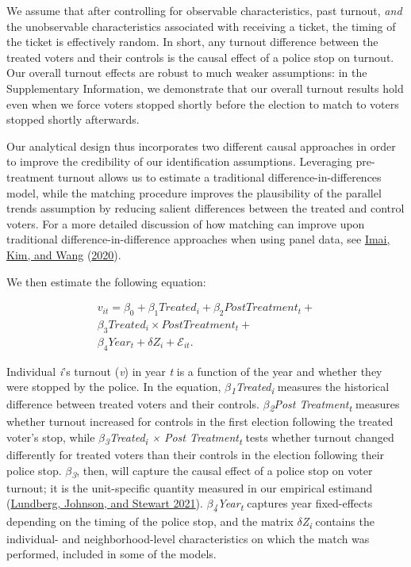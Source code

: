 \documentclass[
  12pt,
]{article}
\begin{document}
We assume that after controlling for observable characteristics, past turnout, \emph{and} the unobservable characteristics associated with receiving a ticket, the timing of the ticket is effectively random. In short, any turnout difference between the treated voters and their controls is the causal effect of a police stop on turnout. Our overall turnout effects are robust to much weaker assumptions: in the Supplementary Information, we demonstrate that our overall turnout results hold even when we force voters stopped shortly before the election to match to voters stopped shortly afterwards.

Our analytical design thus incorporates two different causal approaches in order to improve the credibility of our identification assumptions. Leveraging pre-treatment turnout allows us to estimate a traditional difference-in-differences model, while the matching procedure improves the plausibility of the parallel trends assumption by reducing salient differences between the treated and control voters. For a more detailed discussion of how matching can improve upon traditional difference-in-difference approaches when using panel data, see \protect\hyperlink{ref-Imai2020}{Imai, Kim, and Wang} (\protect\hyperlink{ref-Imai2020}{2020}).

We then estimate the following equation:

\begin{gather}
\label{eq:1}
v_{it}=\beta_0+\beta_1Treated_{i}+\beta_2Post Treatment_{t} + \nonumber \\
\beta_3Treated_{i}\times Post Treatment_{t} + \\
\beta_4Year_{t} + \delta{Z}_{i} + \mathcal{E}_{it}. \nonumber
\end{gather}

Individual \emph{i}'s turnout (\emph{v}) in year \emph{t} is a function of the year and whether they were stopped by the police. In the equation, \emph{\(\beta\)\textsubscript{1}Treated\textsubscript{i}} measures the historical difference between treated voters and their controls. \emph{\(\beta\)\textsubscript{2}Post Treatment\textsubscript{t}} measures whether turnout increased for controls in the first election following the treated voter's stop, while \emph{\(\beta\)\textsubscript{3}Treated\textsubscript{i} × Post Treatment\textsubscript{t}} tests whether turnout changed differently for treated voters than their controls in the election following their police stop. \emph{\(\beta\)\textsubscript{3}}, then, will capture the causal effect of a police stop on voter turnout; it is the unit-specific quantity measured in our empirical estimand (\protect\hyperlink{ref-Lundberg2021}{Lundberg, Johnson, and Stewart 2021}). \emph{\(\beta\)\textsubscript{4}Year\textsubscript{t}} captures year fixed-effects depending on the timing of the police stop, and the matrix \emph{\(\delta\)Z\textsubscript{i}} contains the individual- and neighborhood-level characteristics on which the match was performed, included in some of the models.
\end{document}
